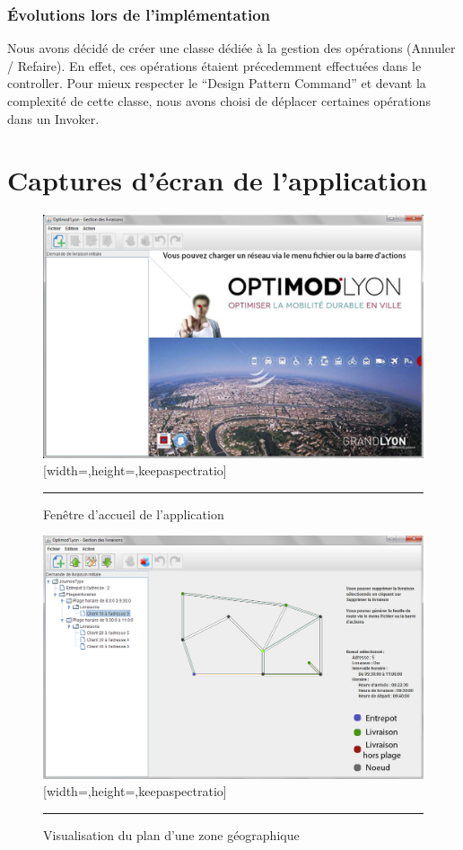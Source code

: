 \subsubsection{Évolutions lors de l'implémentation}
Nous avons décidé de créer une classe dédiée à la gestion des opérations (Annuler / Refaire). En effet, ces opérations étaient précedemment effectuées dans le controller. Pour mieux respecter le “Design Pattern Command” et devant la complexité de cette classe, nous avons choisi de déplacer certaines opérations dans un Invoker.



\section{Captures d'écran de l'application}
\begin{figure}[H]
	\centering
		\includegraphics{Figures/welcome}[width=\textwidth,height=\textheight,keepaspectratio]
		\rule{35em}{0.5pt}
	\caption[Fenêtre d'accueil de l'application]{Fenêtre d'accueil de l'application}
\end{figure}
\begin{figure}[H]
	\centering
		\includegraphics{Figures/plan}[width=\textwidth,height=\textheight,keepaspectratio]
		\rule{35em}{0.5pt}
	\caption[Visualisation du plan d'une zone géographique]{Visualisation du plan d'une zone géographique}
\end{figure}
